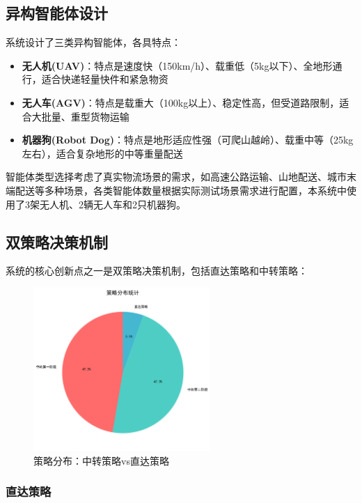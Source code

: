 \documentclass[12pt,a4paper]{article}
\begin{document}
\subsection{异构智能体设计}

系统设计了三类异构智能体，各具特点：

\begin{itemize}
    \item \textbf{无人机(UAV)}：特点是速度快（150km/h）、载重低（5kg以下）、全地形通行，适合快递轻量快件和紧急物资
    \item \textbf{无人车(AGV)}：特点是载重大（100kg以上）、稳定性高，但受道路限制，适合大批量、重型货物运输
    \item \textbf{机器狗(Robot Dog)}：特点是地形适应性强（可爬山越岭）、载重中等（25kg左右），适合复杂地形的中等重量配送
\end{itemize}

智能体类型选择考虑了真实物流场景的需求，如高速公路运输、山地配送、城市末端配送等多种场景，各类智能体数量根据实际测试场景需求进行配置，本系统中使用了3架无人机、2辆无人车和2只机器狗。

\subsection{双策略决策机制}

系统的核心创新点之一是双策略决策机制，包括直达策略和中转策略：

\begin{figure}[h]
    \centering
    \includegraphics[width=0.6\textwidth]{analysis_results/strategy_distribution_20250617_081450.png}
    \caption{策略分布：中转策略vs直达策略}
    \label{fig:strategy-distribution}
\end{figure}

\subsubsection{直达策略}
\end{document}
